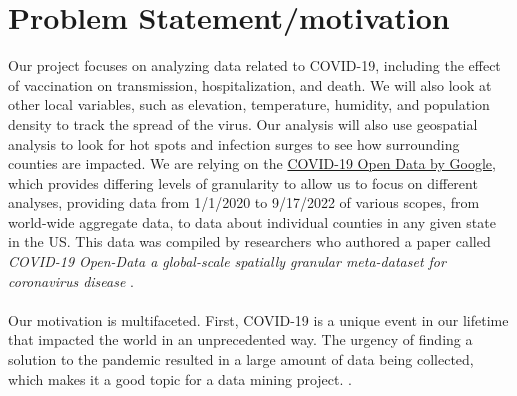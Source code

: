 \documentclass[sigconf,screen,nonacm]{acmart}
\begin{document}
\section{Problem Statement/motivation}
Our project focuses on analyzing data related to COVID-19, including the effect of vaccination on transmission, hospitalization, and death. We will also look at other local variables, such as elevation, temperature, humidity, and population density to track the spread of the virus. Our analysis will also use geospatial analysis to look for hot spots and infection surges to see how surrounding counties are impacted. We are relying on the \href{https://health.google.com/covid-19/open-data/}{COVID-19 Open Data by Google}, which provides differing levels of granularity to allow us to focus on different analyses, providing data from 1/1/2020 to 9/17/2022 of various scopes, from world-wide aggregate data, to data about individual counties in any given state in the US. This data was compiled by researchers who authored a paper called \textit{COVID-19 Open-Data a global-scale spatially granular meta-dataset for coronavirus disease} \cite{wahltinez2022covid}.\\ \\
Our motivation is multifaceted. First, COVID-19 is a unique event in our lifetime that impacted the world in an unprecedented way. The urgency of finding a solution to the pandemic resulted in a large amount of data being collected, which makes it a good topic for a data mining project. 
\cite{wahltinez2022covid}. \\
\end{document}
